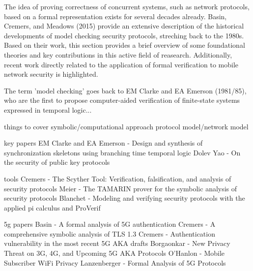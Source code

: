 The idea of proving correctness of concurrent systems, such as network protocols, based on a formal representation exists for several decades already.
Basin, Cremers, and Meadows (2015) provide an extensive description of the historical developments of model checking security protocols, streching back to the 1980s.
Based on their work, this section provides a brief overview of some foundational theories and key contributions in this active field of reasearch.
Additionally, recent work directly related to the application of formal verification to mobile network security is highlighted.

The term 'model checking' goes back to EM Clarke and EA Emerson (1981/85), who are the first to propose computer-aided verification of finite-state systems expressed in temporal logic...

things to cover
symbolic/computational approach
protocol model/network model

key papers
EM Clarke and EA Emerson - Design and synthesis of synchronization skeletons using branching time temporal logic
Dolev Yao - On the security of public key protocols

tools
Cremers - The Scyther Tool: Verification, falsification, and analysis of security protocols
Meier - The TAMARIN prover for the symbolic analysis of security protocols
Blanchet - Modeling and verifying security protocols with the applied pi calculus and ProVerif

5g papers
Basin - A formal analysis of 5G authentication
Cremers - A comprehensive symbolic analysis of TLS 1.3
Cremers - Authentication vulnerability in the most recent 5G AKA drafts
Borgaonkar - New Privacy Threat on 3G, 4G, and Upcoming 5G AKA Protocols
O’Hanlon - Mobile Subscriber WiFi Privacy
Lanzenberger - Formal Analysis of 5G Protocols
